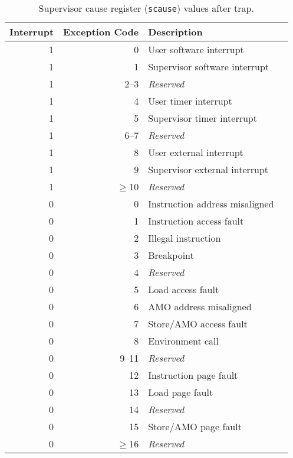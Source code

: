 \begin{table*}[h!]
\begin{center}
\begin{tabular}{|r|r|l|l|}

  \hline
  Interrupt & Exception Code  & Description \\
  \hline	 
  1         & 0               & User software interrupt \\
  1         & 1               & Supervisor software interrupt \\
  1         & 2--3            & {\em Reserved} \\
  1         & 4               & User timer interrupt \\
  1         & 5               & Supervisor timer interrupt \\
  1         & 6--7            & {\em Reserved} \\
  1         & 8               & User external interrupt \\
  1         & 9               & Supervisor external interrupt \\
  1         & $\ge$10          & {\em Reserved} \\ \hline
  0         & 0               & Instruction address misaligned \\
  0         & 1               & Instruction access fault \\
  0         & 2               & Illegal instruction \\   
  0         & 3               & Breakpoint \\
  0         & 4               & {\em Reserved} \\
  0         & 5               & Load access fault \\
  0         & 6               & AMO address misaligned \\
  0         & 7               & Store/AMO access fault \\
  0         & 8               & Environment call \\
  0         & 9--11           & {\em Reserved} \\
  0         & 12              & Instruction page fault \\
  0         & 13              & Load page fault \\
  0         & 14              & {\em Reserved} \\
  0         & 15              & Store/AMO page fault \\
  0         & $\ge$16         & {\em Reserved} \\
  \hline
\end{tabular}
\end{center}
\caption{Supervisor cause register ({\tt scause}) values after trap.}
\label{scauses}
\end{table*}

